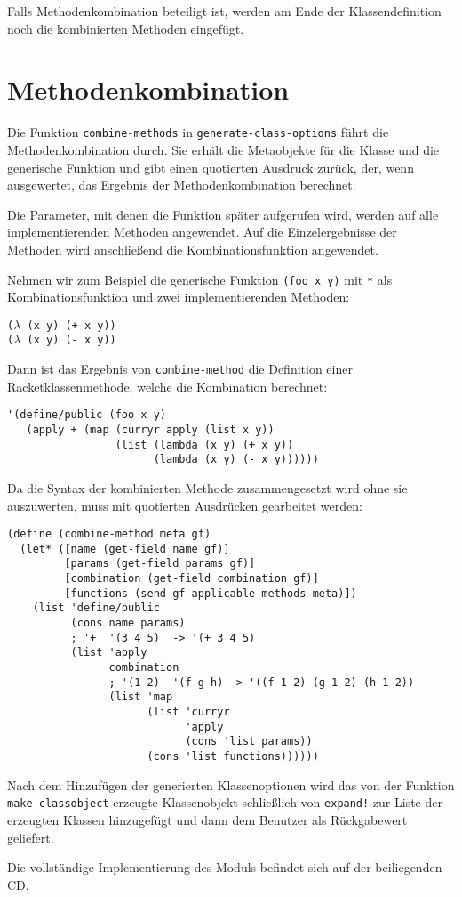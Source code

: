Falls Methodenkombination beteiligt ist, werden am Ende der Klassendefinition noch die kombinierten Methoden eingefügt.

\section{Methodenkombination}
\label{combination-impl}
Die Funktion \texttt{combine-methods} in \texttt{generate-class-options} führt die Methodenkombination durch. Sie erhält die Metaobjekte für die Klasse und die generische Funktion und gibt einen quotierten Ausdruck zurück, der, wenn ausgewertet, das Ergebnis der Methodenkombination berechnet.

Die Parameter, mit denen die Funktion später aufgerufen wird, werden auf alle implementierenden Methoden angewendet. Auf die Einzelergebnisse der Methoden wird anschließend die Kombinationsfunktion angewendet.

Nehmen wir zum Beispiel die generische Funktion \texttt{(foo x y)} mit \texttt{*} als Kombinationsfunktion und zwei implementierenden Methoden:

\texttt{($\lambda$ (x y) (+ x y))\\
($\lambda$ (x y) (- x y))}

Dann ist das Ergebnis von \texttt{combine-method} die Definition einer Racketklassenmethode, welche die Kombination berechnet:

\begin{lstlisting}
'(define/public (foo x y)
   (apply + (map (curryr apply (list x y))
                 (list (lambda (x y) (+ x y))
                       (lambda (x y) (- x y))))))
\end{lstlisting}

Da die Syntax der kombinierten Methode zusammengesetzt wird ohne sie auszuwerten, muss mit quotierten Ausdrücken gearbeitet werden:

\begin{lstlisting}
(define (combine-method meta gf)
  (let* ([name (get-field name gf)]
         [params (get-field params gf)]
         [combination (get-field combination gf)]
         [functions (send gf applicable-methods meta)])
    (list 'define/public
          (cons name params)
          ; '+  '(3 4 5)  -> '(+ 3 4 5)
          (list 'apply
                combination
                ; '(1 2)  '(f g h) -> '((f 1 2) (g 1 2) (h 1 2))
                (list 'map
                      (list 'curryr
                            'apply
                            (cons 'list params))
                      (cons 'list functions))))))
\end{lstlisting}

Nach dem Hinzufügen der generierten Klassenoptionen wird das von der Funktion \texttt{make-classobject} erzeugte Klassenobjekt schließlich von \texttt{expand!} zur Liste der erzeugten Klassen hinzugefügt und dann dem Benutzer als Rückgabewert geliefert. 

Die vollständige Implementierung des Moduls befindet sich auf der beiliegenden CD.